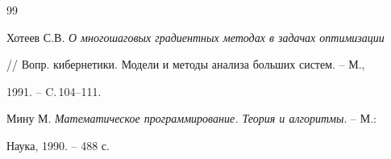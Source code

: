 \begin{thebibliography}{99}


Хотеев С.В. {\em О многошаговых градиентных методах в задачах оптимизации}


// Вопр. кибернетики. Модели и методы анализа больших систем. -- М.,


1991. -- C.\,104--111.




Мину М. {\em Математическое программирование. Теория и алгоритмы}. -- М.:


Наука, 1990. -- 488 с.





\end{thebibliography}





\vskip 2cm












\label{end}





